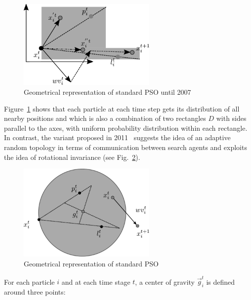 \begin{figure} [H]
\centering
    \includegraphics[width=0.60\textwidth]{"Part 2 - Search-Based Optimization/Particle Swarm Optimization/Images/SPSO2011-1.pdf"}
    \caption{Geometrical representation of standard PSO until 2007}
    \label{fig:STANDARDPSO_1}
\end{figure}


    
Figure~\ref{fig:STANDARDPSO_1} shows that each particle at each time step gets its distribution of all nearby positions and which is also a combination of two rectangles $D$ with sides parallel to the axes, with uniform probability distribution within each rectangle. In contrast, the variant proposed in 2011~\cite{clerc2012beyond} suggests the idea of an adaptive random topology in terms of communication between search agents and exploits the idea of rotational invariance (see Fig.~\ref{fig:STANDARDPSO}).


\begin{figure} [H]
\centering
    \includegraphics[width=0.60\textwidth]{"Part 2 - Search-Based Optimization/Particle Swarm Optimization/Images/SPSO2011.pdf"}
    \caption{Geometrical representation of standard PSO}
    \label{fig:STANDARDPSO}
\end{figure}



For each particle $i$ and at each time stage $t$, a center of gravity ${\vec{g}}_i^t$ is defined around three points:

